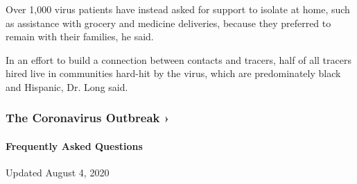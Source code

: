 Over 1,000 virus patients have instead asked for support to isolate at
home, such as assistance with grocery and medicine deliveries, because
they preferred to remain with their families, he said.

In an effort to build a connection between contacts and tracers, half of
all tracers hired live in communities hard-hit by the virus, which are
predominately black and Hispanic, Dr. Long said.

\href{https://www.nytimes.com/news-event/coronavirus?action=click\&pgtype=Article\&state=default\&region=MAIN_CONTENT_3\&context=storylines_faq}{}

\hypertarget{the-coronavirus-outbreak-}{%
\subsubsection{The Coronavirus Outbreak
›}\label{the-coronavirus-outbreak-}}

\hypertarget{frequently-asked-questions}{%
\paragraph{Frequently Asked
Questions}\label{frequently-asked-questions}}

Updated August 4, 2020

